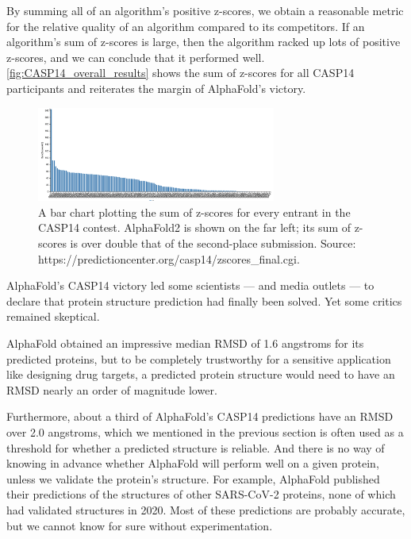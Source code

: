 {{By summing all of an algorithm's positive z-scores, we obtain a reasonable metric for the relative quality of an algorithm compared to its competitors. If an algorithm's sum of z-scores is large, then the algorithm racked up lots of positive z-scores, and we can conclude that it performed well. \autoref{fig:CASP14_overall_results} shows the sum of z-scores for all CASP14 participants and reiterates the margin of AlphaFold's victory.

\begin{figure}[h]
	\centering
	\mySfFamily
	\includegraphics[width = 0.7\textwidth]{../images/CASP14_overall_results.png}
	\caption{A bar chart plotting the sum of z-scores for every entrant in the CASP14 contest. AlphaFold2 is shown on the far left; its sum of z-scores is over double that of the second-place submission. Source: https://predictioncenter.org/casp14/zscores_final.cgi.}
	\label{fig:CASP14_overall_results}
\end{figure}

AlphaFold's CASP14 victory led some scientists --- and media outlets --- to declare that protein structure prediction had finally been solved. Yet some critics remained skeptical.

AlphaFold obtained an impressive median RMSD of 1.6 angstroms for its predicted proteins, but to be completely trustworthy for a sensitive application like designing drug targets, a predicted protein structure would need to have an RMSD nearly an order of magnitude lower.

Furthermore, about a third of AlphaFold's CASP14 predictions have an RMSD over 2.0 angstroms, which we mentioned in the previous section is often used as a threshold for whether a predicted structure is reliable. And there is no way of knowing in advance whether AlphaFold will perform well on a given protein, unless we validate the protein's structure. For example, AlphaFold published their predictions of the structures of other SARS-CoV-2 proteins, none of which had validated structures in 2020. Most of these predictions are probably accurate, but we cannot know for sure without experimentation.

}}
